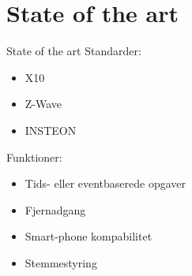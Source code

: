 \section{State of the art}
\begin{frame}{State of the art}{}
Standarder:\linebreak
\begin{itemize}
\item X10
\item Z-Wave
\item INSTEON
\end{itemize}
Funktioner:\linebreak
\begin{itemize}
\item Tids- eller eventbaserede opgaver
\item Fjernadgang
\item Smart-phone kompabilitet
\item Stemmestyring
\end{itemize}
\end{frame}